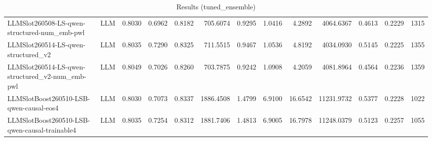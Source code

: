 \begin{table}[htbp]
{\begin{tabular}{ll|rrrrrrrrrr|r}
LLMSlot260508-LS-qwen-structured-num\_emb-pwl & LLM & 0.8030 & 0.6962 & 0.8182 & 705.6074 & 0.9295 & 1.0416 & 4.2892 & 4064.6367 & 0.4613 & 0.2229 & 1315 \\
LLMSlot260514-LS-qwen-structured\_v2 & LLM & 0.8035 & 0.7290 & 0.8325 & 711.5515 & 0.9467 & 1.0536 & 4.8192 & 4034.0930 & 0.5145 & 0.2225 & 1355 \\
LLMSlot260514-LS-qwen-structured\_v2-num\_emb-pwl & LLM & 0.8049 & 0.7026 & 0.8260 & 703.7875 & 0.9242 & 1.0908 & 4.2059 & 4081.8964 & 0.4564 & 0.2236 & 1359 \\
LLMSlotBoost260510-LSB-qwen-causal-eos4 & LLM & 0.8030 & 0.7073 & 0.8337 & 1886.4508 & 1.4799 & 6.9100 & 16.6542 & 11231.9732 & 0.5377 & 0.2228 & 1022 \\
LLMSlotBoost260510-LSB-qwen-causal-trainable4 & LLM & 0.8035 & 0.7254 & 0.8312 & 1881.7406 & 1.4813 & 6.9005 & 16.7978 & 11248.0379 & 0.5123 & 0.2257 & 1055 \\
\bottomrule
\end{tabular}
}
\caption{Results (tuned_ensemble)}
\label{tab:results_tuned_ensemble}
\end{table}